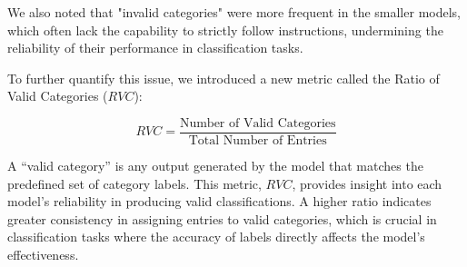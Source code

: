 We also noted that "invalid categories" were more frequent in the smaller models, which often lack the capability to strictly follow instructions, undermining the reliability of their performance in classification tasks.

To further quantify this issue, we introduced a new metric called the Ratio of Valid Categories ($RVC$):

\begin{equation}
\text{$RVC$} = \frac{\text{Number of Valid Categories}}{\text{Total Number of Entries}}
\end{equation}

A “valid category” is any output generated by the model that matches the predefined set of category labels. 
This metric, $RVC$, provides insight into each model's reliability in producing valid classifications. A higher ratio indicates greater consistency in assigning entries to valid categories, which is crucial in classification tasks where the accuracy of labels directly affects the model's effectiveness.

